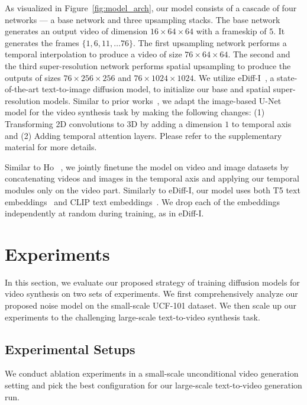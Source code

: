 \documentclass[10pt,twocolumn,letterpaper]{article}
\newcommand{\ediffi}{eDiff-I\xspace}
\begin{document}
As visualized in Figure~\ref{fig:model_arch}, our model consists of a cascade of four networks --- a base network and three upsampling stacks. The base network generates an output video of dimension $16 \times 64 \times 64$ with a frameskip of $5$. It generates the frames $\{ 1, 6, 11, \hdots 76 \}$. The first upsampling network performs a temporal interpolation to produce a video of size $76 \times 64 \times 64$. The second and the third super-resolution network performs spatial upsampling to produce the outputs of sizes $76 \times 256 \times 256$ and $76 \times 1024 \times 1024$. We utilize \ediffi~\cite{balaji2022ediffi}, a state-of-the-art text-to-image diffusion model, to initialize our base and spatial super-resolution models. Similar to prior works~\cite{ho2022video, singer2022make}, we adapt the image-based U-Net model for the video synthesis task by making the following changes: (1) Transforming 2D convolutions to 3D by adding a dimension $1$ to temporal axis and (2) Adding temporal attention layers. Please refer to the supplementary material for more details. 

Similar to Ho \etal~\cite{ho2022video}, we jointly finetune the model on video and image datasets by concatenating videos and images in the temporal axis and applying our temporal modules only on the video part. Similarly to \ediffi, our model uses both T5 text embeddings~\cite{raffel2020exploring} and CLIP text embeddings~\cite{radford2021learning}. We drop each of the embeddings independently at random during training, as in \ediffi. 




 \section{Experiments}\label{sec:expr}

In this section, we evaluate our proposed strategy of training diffusion models for video synthesis on two sets of experiments. We first comprehensively analyze our proposed noise model on the small-scale UCF-101 dataset. We then scale up our experiments to the challenging large-scale text-to-video synthesis task.








\subsection{Experimental Setups}
We conduct ablation experiments in a small-scale unconditional video generation setting and pick the best configuration for our large-scale text-to-video generation run.
\end{document}
